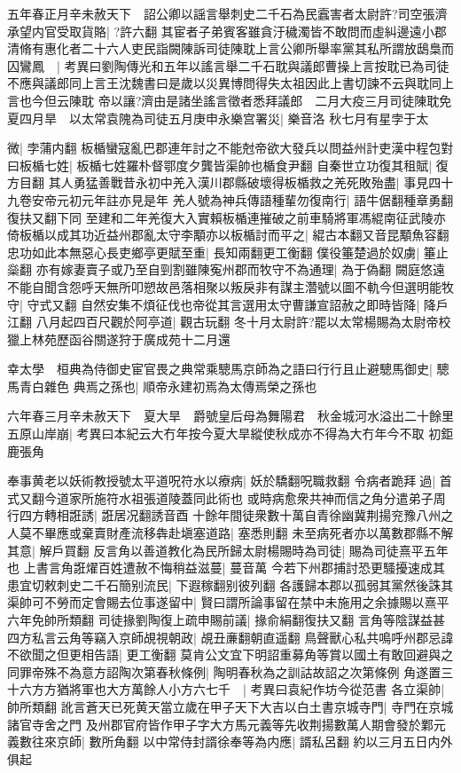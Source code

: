 五年春正月辛未赦天下　詔公卿以謡言舉刺史二千石為民蠧害者太尉許?司空張濟承望内官受取貨賂|{
	?許六翻}
其宦者子弟賓客雖貪汙穢濁皆不敢問而虛糾邊遠小郡清脩有惠化者二十六人吏民詣闕陳訴司徒陳耽上言公卿所舉率黨其私所謂放鴟梟而囚鸞鳳　|{
	考異曰劉陶傳光和五年以謠言舉二千石耽與議郎曹操上言按耽已為司徒不應與議郎同上言王沈魏書曰是歲以災異博問得失太祖因此上書切諫不云與耽同上言也今但云陳耽}
帝以讓?濟由是諸坐謠言徵者悉拜議郎　二月大疫三月司徒陳耽免　夏四月旱　以太常袁隗為司徒五月庚申永樂宫署災|{
	樂音洛}
秋七月有星孛于太

微|{
	孛蒲内翻}
板楯蠻寇亂巴郡連年討之不能尅帝欲大發兵以問益州計吏漢中程包對曰板楯七姓|{
	板楯七姓羅朴督鄂度夕龔皆渠帥也楯食尹翻}
自秦世立功復其租賦|{
	復方目翻}
其人勇猛善戰昔永初中羌入漢川郡縣破壞得板楯救之羌死敗殆盡|{
	事見四十九卷安帝元初元年註亦見是年}
羌人號為神兵傳語種輩勿復南行|{
	語牛倨翻種章勇翻復扶又翻下同}
至建和二年羌復大入實賴板楯連摧破之前車騎將軍馮緄南征武陵亦倚板楯以成其功近益州郡亂太守李顒亦以板楯討而平之|{
	緄古本翻又音昆顒魚容翻}
忠功如此本無惡心長吏鄉亭更賦至重|{
	長知兩翻更工衡翻}
僕役箠楚過於奴虜|{
	箠止橤翻}
亦有嫁妻賣子或乃至自剄割雖陳寃州郡而牧守不為通理|{
	為于偽翻}
闕庭悠遠不能自聞含怨呼天無所叩愬故邑落相聚以叛戾非有謀主濳號以圖不軌今但選明能牧守|{
	守式又翻}
自然安集不煩征伐也帝從其言選用太守曹謙宣詔赦之即時皆降|{
	降戶江翻}
八月起四百尺觀於阿亭道|{
	觀古玩翻}
冬十月太尉許?罷以太常楊賜為太尉帝校獵上林苑歷函谷關遂狩于廣成苑十二月還

幸太學　桓典為侍御史宦官畏之典常乘驄馬京師為之語曰行行且止避驄馬御史|{
	驄馬青白雜色}
典焉之孫也|{
	順帝永建初焉為太傳焉榮之孫也}


六年春三月辛未赦天下　夏大旱　爵號皇后母為舞陽君　秋金城河水溢出二十餘里　五原山岸崩|{
	考異曰本紀云大冇年按今夏大旱縱使秋成亦不得為大冇年今不取}
初鉅鹿張角

奉事黄老以妖術教授號太平道呪符水以療病|{
	妖於驕翻呪職救翻}
令病者跪拜過|{
	首式又翻今道家所施符水祖張道陵蓋同此術也}
或時病愈衆共神而信之角分遣弟子周行四方轉相誑誘|{
	誑居况翻誘音酉}
十餘年間徒衆數十萬自青徐幽冀荆揚兖豫八州之人莫不畢應或棄賣財產流移犇赴塡塞道路|{
	塞悉則翻}
未至病死者亦以萬數郡縣不解其意|{
	解戶買翻}
反言角以善道教化為民所歸太尉楊賜時為司徒|{
	賜為司徒熹平五年也}
上書言角誑燿百姓遭赦不悔稍益滋蔓|{
	蔓音萬}
今若下州郡捕討恐更騷擾速成其患宜切敕刺史二千石簡别流民|{
	下遐稼翻别彼列翻}
各護歸本郡以孤弱其黨然後誅其渠帥可不勞而定會賜去位事遂留中|{
	賢曰謂所論事留在禁中未施用之余據賜以熹平六年免帥所類翻}
司徒掾劉陶復上疏申賜前議|{
	掾俞絹翻復扶又翻}
言角等陰謀益甚四方私言云角等竊入京師覘視朝政|{
	覘丑亷翻朝直遥翻}
鳥聲獸心私共鳴呼州郡忌諱不欲聞之但更相告語|{
	更工衡翻}
莫肯公文宜下明詔重募角等賞以國土有敢回避與之同罪帝殊不為意方詔陶次第春秋條例|{
	陶明春秋為之訓詁故詔之次第條例}
角遂置三十六方方猶將軍也大方萬餘人小方六七千　|{
	考異曰袁紀作坊今從范書}
各立渠帥|{
	帥所類翻}
訛言蒼天已死黄天當立歲在甲子天下大吉以白土書京城寺門|{
	寺門在京城諸官寺舍之門}
及州郡官府皆作甲子字大方馬元義等先收荆揚數萬人期會發於鄴元義數往來京師|{
	數所角翻}
以中常侍封諝徐奉等為内應|{
	諝私呂翻}
約以三月五日内外俱起

